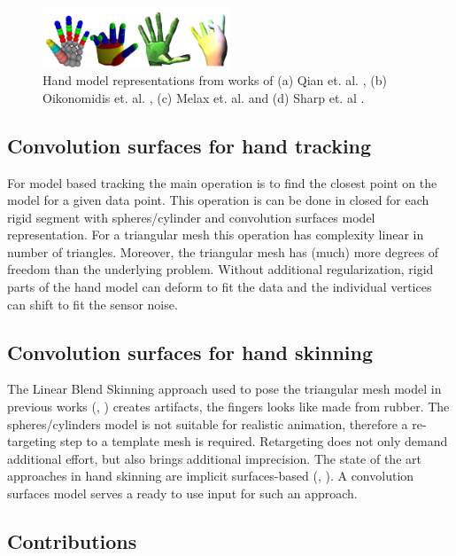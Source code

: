 \documentclass[10pt,journal,a4paper]{IEEEtran}
\begin{document}
\begin{figure}[h!] 
	\centering
	\hspace{-2em}
	\includegraphics[width=0.5\textwidth]{figures/hand_model_representations}
	\caption{Hand model representations from works of (a) Qian et. al. \cite{qian2014realtime}, (b)  Oikonomidis et. al. \cite{oikonomidis2014evolutionary}, (c) Melax et. al. \cite{melax2013dynamics} and (d) Sharp et. al \cite{sharp2015accurate}.}
	\label{fig:hand_model_representations}
\end{figure}

\subsection{Convolution surfaces for hand tracking}
For model based tracking the main operation is to find the closest point on the model for a given data point. This operation is can be done in closed for each rigid segment with spheres/cylinder and convolution surfaces model representation. For a triangular mesh this operation has complexity linear in number of triangles. Moreover, the triangular mesh has (much) more degrees of freedom than the underlying problem. Without additional regularization, rigid parts of the hand model can deform to fit the data and the individual vertices can shift to fit the sensor noise.

\subsection{Convolution surfaces for hand skinning}
The Linear Blend Skinning approach used to pose the triangular mesh model in previous works (\cite{sharp2015accurate}, \cite{schroder2013analysis} ) creates artifacts, the fingers looks like made from rubber. The spheres/cylinders model is not suitable for realistic animation, therefore a re-targeting step to a template mesh is required. Retargeting does not only demand additional effort, but also brings additional imprecision. The state of the art approaches in hand skinning are implicit surfaces-based (\cite{vaillant2013implicit},  \cite{vaillant2014robust} ).  A convolution surfaces model serves a ready to use input for such an approach.

\subsection{Contributions}
\end{document}
